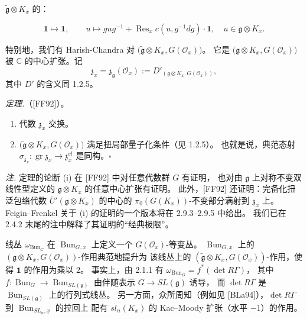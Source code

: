 $\tilde{\mathfrak{g}}\otimes K_x$ 的：

\begin{equation}\tag{19}
\mathbf{1}\mapsto\mathbf{1},\qquad
u\mapsto gug^{-1}+\operatorname{Res}_x c(u,g^{-1}dg)\cdot\mathbf{1},
\quad u\in\mathfrak{g}\otimes K_x .
\end{equation}

特别地，我们有 Harish-Chandra 对 $\bigl(\tilde{\mathfrak{g}}\otimes K_x, G(\mathcal{O}_x)\bigr)$。
它是 $\bigl(\mathfrak{g}\otimes K_x, G(\mathcal{O}_x)\bigr)$ 被 $\mathbb{C}$ 的中心扩张。记
\[
\mathfrak{z}_x=\mathfrak{z}_{\mathfrak{g}}(\mathcal{O}_x):=D'_{(\mathfrak{g}\otimes K_x,G(\mathcal{O}_x))},
\]
其中 $D'$ 的含义同 1.2.5。

\emph{定理.}（[FF92]）。
\begin{enumerate}[label=(\roman*),leftmargin=2.2em]
\item 代数 $\mathfrak{z}_x$ 交换。
\item $\bigl(\tilde{\mathfrak{g}}\otimes K_x, G(\mathcal{O}_x)\bigr)$ 满足扭局部量子化条件（见 1.2.5）。
  也就是说，典范态射 $\sigma_{\mathfrak{z}_x}: \operatorname{gr}\mathfrak{z}_x\to\mathfrak{z}^{cl}_x$ 是同构。\hfill$\square$
\end{enumerate}

\emph{注.} 定理的论断 (i) 在 [FF92] 中对任意代数群 $G$ 有证明，
也对由 $\mathfrak{g}$ 上对称不变双线性型定义的 $\mathfrak{g}\otimes K_x$ 的任意中心扩张有证明。
此外，[FF92] 还证明：完备化扭泛包络代数 $\overline{U}'(\mathfrak{g}\otimes K_x)$ 的中心的
$\pi_0(G(K_x))$-不变部分满射到 $\mathfrak{z}_x$ 上。
Feigin–Frenkel 关于 (i) 的证明的一个版本将在 2.9.3–2.9.5 中给出。
我们已在 2.4.2 末尾的注中解释了其证明的“经典极限”。

 线丛 $\omega_{\operatorname{Bun}_G}$ 在 $\operatorname{Bun}_{G,\underline{x}}$ 上定义一个 $G(\mathcal{O}_x)$-等变丛。
$\operatorname{Bun}_{G,\underline{x}}$ 上的 $(\mathfrak{g}\otimes K_x, G(\mathcal{O}_x))$-作用典范地提升为
该线丛上的 $(\tilde{\mathfrak{g}}\otimes K_x, G(\mathcal{O}_x))$-作用，使得 $\mathbf{1}$ 的作用为乘以 2。
事实上，由 2.1.1 有 $\omega_{\operatorname{Bun}_G}=f^*(\det R\Gamma)$，
其中 $f: \operatorname{Bun}_G\to\operatorname{Bun}_{SL(\mathfrak{g})}$ 由伴随表示 $G\to SL(\mathfrak{g})$ 诱导，
而 $\det R\Gamma$ 是 $\operatorname{Bun}_{SL(\mathfrak{g})}$ 上的行列式线丛。
另一方面，众所周知（例如见 [BLa94]），$\det R\Gamma$ 到 $\operatorname{Bun}_{SL_n,\underline{x}}$ 的拉回上
配有 $sl_n(K_x)$ 的 Kac–Moody 扩张（水平 $-1$）的作用。

